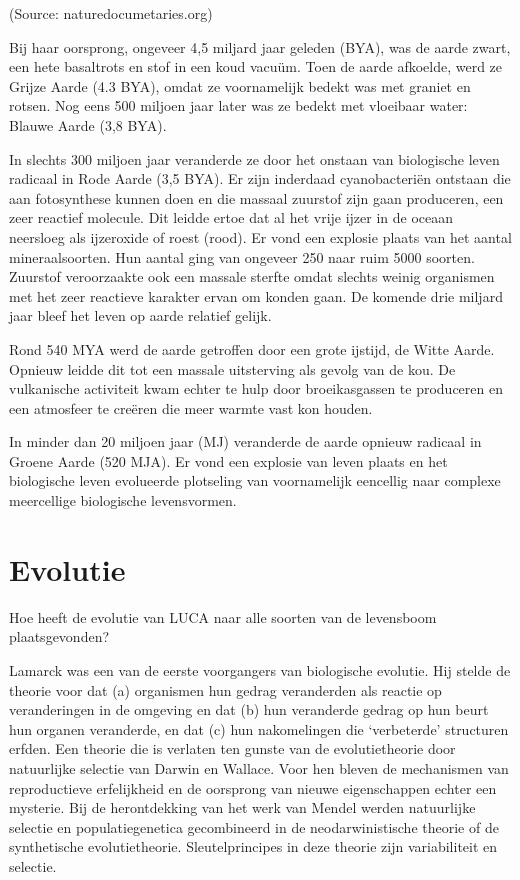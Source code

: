 \documentclass[
  11pt,
]{book}
\begin{document}
(Source: naturedocumetaries.org)

Bij haar oorsprong, ongeveer 4,5 miljard jaar geleden (BYA), was de aarde zwart, een hete basaltrots en stof in een koud vacuüm. Toen de aarde afkoelde, werd ze Grijze Aarde (4.3 BYA), omdat ze voornamelijk bedekt was met graniet en rotsen. Nog eens 500 miljoen jaar later was ze bedekt met vloeibaar water: Blauwe Aarde (3,8 BYA).

In slechts 300 miljoen jaar veranderde ze door het onstaan van biologische leven radicaal in Rode Aarde (3,5 BYA). Er zijn inderdaad cyanobacteriën ontstaan die aan fotosynthese kunnen doen en die massaal zuurstof zijn gaan produceren, een zeer reactief molecule. Dit leidde ertoe dat al het vrije ijzer in de oceaan neersloeg als ijzeroxide of roest (rood). Er vond een explosie plaats van het aantal mineraalsoorten. Hun aantal ging van ongeveer 250 naar ruim 5000 soorten. Zuurstof veroorzaakte ook een massale sterfte omdat slechts weinig organismen met het zeer reactieve karakter ervan om konden gaan. De komende drie miljard jaar bleef het leven op aarde relatief gelijk.

Rond 540 MYA werd de aarde getroffen door een grote ijstijd, de Witte Aarde. Opnieuw leidde dit tot een massale uitsterving als gevolg van de kou. De vulkanische activiteit kwam echter te hulp door broeikasgassen te produceren en een atmosfeer te creëren die meer warmte vast kon houden.

In minder dan 20 miljoen jaar (MJ) veranderde de aarde opnieuw radicaal in Groene Aarde (520 MJA). Er vond een explosie van leven plaats en het biologische leven evolueerde plotseling van voornamelijk eencellig naar complexe meercellige biologische levensvormen.

\hypertarget{evolutie}{%
\section{Evolutie}\label{evolutie}}

Hoe heeft de evolutie van LUCA naar alle soorten van de levensboom plaatsgevonden?

Lamarck was een van de eerste voorgangers van biologische evolutie. Hij stelde de theorie voor dat (a) organismen hun gedrag veranderden als reactie op veranderingen in de omgeving en dat (b) hun veranderde gedrag op hun beurt hun organen veranderde, en dat (c) hun nakomelingen die `verbeterde' structuren erfden. Een theorie die is verlaten ten gunste van de evolutietheorie door natuurlijke selectie van Darwin en Wallace. Voor hen bleven de mechanismen van reproductieve erfelijkheid en de oorsprong van nieuwe eigenschappen echter een mysterie. Bij de herontdekking van het werk van Mendel werden natuurlijke selectie en populatiegenetica gecombineerd in de neodarwinistische theorie of de synthetische evolutietheorie. Sleutelprincipes in deze theorie zijn variabiliteit en selectie.
\end{document}
